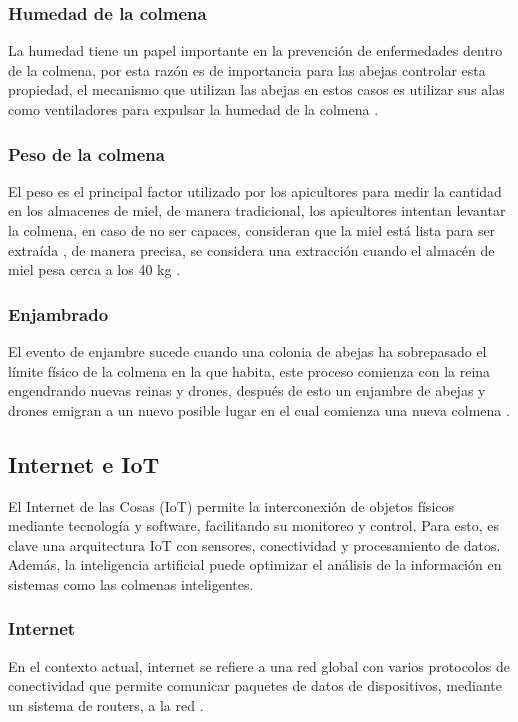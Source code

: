 \documentclass[journal]{IEEEtran} %
\begin{document}
\subsubsection{Humedad de la colmena}
La humedad tiene un papel importante en la prevención de enfermedades dentro de la colmena, por esta razón es de importancia para las abejas controlar esta propiedad, el mecanismo que utilizan las abejas en estos casos es utilizar sus alas como ventiladores para expulsar la humedad de la colmena \cite{Chadwick2016TheBook}.
\subsubsection{Peso de la colmena}
El peso es el principal factor utilizado por los apicultores para medir la cantidad en los almacenes de miel, de manera tradicional, los apicultores intentan levantar la colmena, en caso de no ser capaces, consideran que la miel está lista para ser extraída \cite{Chadwick2016TheBook}, de manera precisa, se considera una extracción cuando el almacén de miel pesa cerca a los 40 kg \cite{DavidCrampABEEKEEPING}.
\subsubsection{Enjambrado}
El evento de enjambre sucede cuando una colonia de abejas ha sobrepasado el límite físico de la colmena en la que habita, este proceso comienza con la reina engendrando nuevas reinas y drones, después de esto un enjambre de abejas y drones emigran a un nuevo posible lugar en el cual comienza una nueva colmena \cite{Chadwick2016TheBook}.
\subsection{Internet e IoT}
El Internet de las Cosas (IoT) permite la interconexión de objetos físicos mediante tecnología y software, facilitando su monitoreo y control. Para esto, es clave una arquitectura IoT con sensores, conectividad y procesamiento de datos. Además, la inteligencia artificial puede optimizar el análisis de la información en sistemas como las colmenas inteligentes.
\subsubsection{Internet}
En el contexto actual, internet se refiere a una red global con varios protocolos de conectividad que permite comunicar paquetes de datos de dispositivos, mediante un sistema de routers, a la red \cite{RajKamal2017INTERNETPrinciples}.
\end{document}
